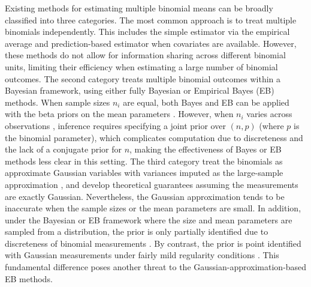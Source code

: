 \documentclass[12pt,letterpaper]{article}
\begin{document}
Existing methods for estimating multiple binomial means can be broadly classified into three categories. The most common approach is to treat multiple binomials independently. This includes the simple estimator via the empirical average and prediction-based estimator when covariates are available. However, these methods do not allow for information sharing across different binomial units, limiting their efficiency when estimating a large number of binomial outcomes. The second category treats multiple binomial outcomes within a Bayesian framework, using either fully Bayesian or Empirical Bayes (EB) methods. When sample sizes $n_i$ are equal, both Bayes and EB can be applied with the beta priors on the mean parameters \citep[][etc.]{griffin1971empirical}. However, when $n_i$ varies across observations \citep[e.g.][]{fienberg1973simultaneous}, inference requires specifying a joint prior over $(n, p)$ (where $p$ is the binomial parameter), which complicates computation due to discreteness and the lack of a conjugate prior for $n$, making the effectiveness of Bayes or EB methods less clear in this setting. The third category 
treat the binomials as approximate Gaussian variables with variances imputed as the large-sample approximation
\citep[e.g.][]{Brown2008inseason,xie2012sure,chen2022empirical,chen2025compound}, and develop theoretical guarantees assuming the measurements are exactly Gaussian. Nevertheless, the Gaussian approximation tends to be inaccurate when the sample sizes or the mean parameters are small. In addition, under the Bayesian or EB framework where the size and mean parameters are sampled from a distribution, the prior is only partially identified due to discreteness of binomial measurements \citep{kline2021reasonable}. By contrast, the prior is point identified with Gaussian measurements under fairly mild regularity conditions \citep[e.g.][]{efron2012large,chen2022empirical}. This fundamental difference poses another threat to the Gaussian-approximation-based EB methods.

\end{document}
